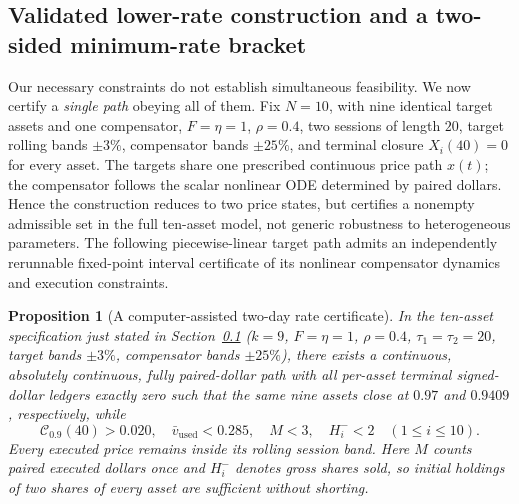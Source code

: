 \documentclass[11pt]{article}
\numberwithin{equation}{section}
\newtheorem{proposition}[theorem]{Proposition}
\theoremstyle{definition}
\theoremstyle{remark}
\newcommand{\Cris}{\mathcal{C}}
\begin{document}
\subsection{Validated lower-rate construction and a two-sided minimum-rate bracket}\label{subsec:v7-certified}
Our necessary constraints do not establish simultaneous feasibility. We now certify a \emph{single path} obeying all of them. Fix $N=10$, with nine identical target assets and one compensator, $F=\eta=1$, $\rho=0.4$, two sessions of length $20$, target rolling bands $\pm3\%$, compensator bands $\pm25\%$, and terminal closure $X_i(40)=0$ for every asset. The targets share one prescribed continuous price path $x(t)$; the compensator follows the scalar nonlinear ODE determined by paired dollars. Hence the construction reduces to two price states, but certifies a nonempty admissible set in the full ten-asset model, not generic robustness to heterogeneous parameters. The following piecewise-linear target path admits an independently rerunnable fixed-point interval certificate of its nonlinear compensator dynamics and execution constraints.
\begin{proposition}[A computer-assisted two-day rate certificate]\label{prop:certified-v7}
In the ten-asset specification just stated in Section~\ref{subsec:v7-certified} ($k=9$, $F=\eta=1$, $\rho=0.4$, $\tau_1=\tau_2=20$, target bands $\pm3\%$, compensator bands $\pm25\%$), there exists a continuous, absolutely continuous, fully paired-dollar path with all per-asset terminal signed-dollar ledgers exactly zero such that the same nine assets close at $0.97$ and $0.9409$, respectively, while
\begin{equation}\label{eq:v7-certified-result}
\boxed{\Cris_{0.9}(40)>0.020,\quad \bar v_{\mathrm{used}}<0.285,\quad M<3,\quad H_i^-<2\quad(1\le i\le10).}
\end{equation}
Every executed price remains inside its rolling session band. Here $M$ counts paired executed dollars once and $H_i^-$ denotes gross shares sold, so initial holdings of two shares of every asset are sufficient without shorting.
\end{proposition}
\end{document}
